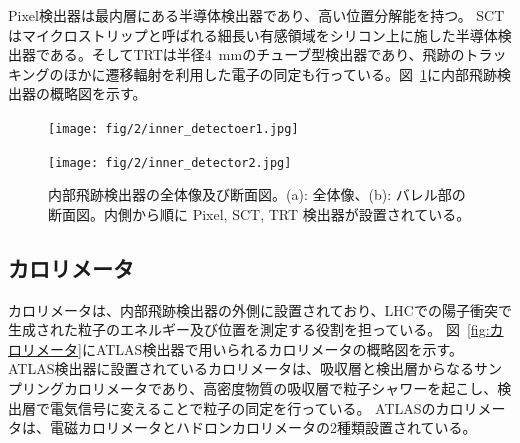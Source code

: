 Pixel検出器は最内層にある半導体検出器であり、高い位置分解能を持つ\cite{Aad:1129811}。
SCT はマイクロストリップと呼ばれる細長い有感領域をシリコン上に施した半導体検出器である\cite{Aad:1129811}。そしてTRTは半径4~mmのチューブ型検出器であり、飛跡のトラッキングのほかに遷移輻射を利用した電子の同定も行っている。図~\ref{fig:内部飛跡検出器}に内部飛跡検出器の概略図を示す。

\begin{figure}
    \centering
    \begin{minipage}[b]{0.4\linewidth}
        \centering
        \texttt{[image: fig/2/inner\_detectoer1.jpg]}
        \vspace{10pt}
        \subcaption{}
        \label{fig:内部飛跡検出器の概略図1}
    \end{minipage}
    \hfill
    \begin{minipage}[b]{0.5\linewidth}
        \centering
        \texttt{[image: fig/2/inner\_detector2.jpg]}
        \vspace{10pt}
        \subcaption{}
        \label{fig:内部飛跡検出器の概略図2}
    \end{minipage}
    \caption{内部飛跡検出器の全体像及び断面図。(a): 全体像\cite{Aad:1129811}、(b): バレル部の断面図。内側から順に Pixel, SCT, TRT 検出器が設置されている。}
    \label{fig:内部飛跡検出器}
\end{figure}



\subsection{カロリメータ}
カロリメータは、内部飛跡検出器の外側に設置されており、LHCでの陽子衝突で生成された粒子のエネルギー及び位置を測定する役割を担っている。
図~\ref{fig:カロリメータ}にATLAS検出器で用いられるカロリメータの概略図を示す。
ATLAS検出器に設置されているカロリメータは、吸収層と検出層からなるサンプリングカロリメータであり、高密度物質の吸収層で粒子シャワーを起こし、検出層で電気信号に変えることで粒子の同定を行っている。
ATLASのカロリメータは、電磁カロリメータとハドロンカロリメータの2種類設置されている。


